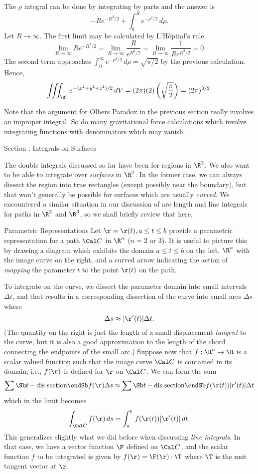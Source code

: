The $\rho$ integral can be done by integrating by parts and the
answer is
$$
 -Re^{-R^2/2} +
\int_0^R e^{-\rho^2/2}\,d\rho.
$$
Let $R \to \infty$.  The first limit may be calculated by L'H\^opital's
rule.
$$
\lim_{R\to\infty}
Re^{-R^2/2} = 
\lim_{R\to\infty}
\frac R{e^{R^2/2}} = 
\lim_{R\to\infty}
\frac 1{R e^{R^2/2}} =  0.
$$
 The second
term approaches $\int_0^\infty e^{-\rho^2/2}\,d\rho = \sqrt{\pi/2}$
by the previous calculation.   Hence,
$$
    \iiint_{\R^3} e^{-(x^2 + y^2 + z^2)/2}\,dV 
= (2\pi)(2)\left(\sqrt{\frac\pi 2}\right) = (2\pi)^{3/2}.
$$
\endexample

\medskip
Note that the argument for Olbers Paradox in the previous section
really involves an improper integral.   So do many gravitational
force calculations which involve integrating functions with
denominators which may vanish.

\bigskip

\bigskip
{}
\head Section \sn.  Integrals on Surfaces \endhead

The double
integrals discussed so far have been for regions in $\R^2$.
We also want to be able to integrate over {\it surfaces\/} in $\R^3$.
In the former case, we can always dissect the region into
true rectangles (except possibly near the boundary), but that
won't generally be possible for surfaces which are usually
{\it curved}.   We encountered a similar situation in our
discussion of arc length and line integrals for paths in
$\R^2$ and $\R^3$, so we shall briefly review that here.

\subhead Parametric Representations \endsubhead
Let $\r = \r(t), a\le t \le b$ provide a parametric representation
for a path $\Cal C$ in $\R^n$ ($n = 2$ or $3$). 
  It is useful to picture
this by drawing a diagram which exhibits the domain $a\le t \le b$
on the left, $\R^n$ with the image curve on the right, and a
curved arrow indicating the action of {\it mapping\/} the parameter
$t$ to the point $\r(t)$ on the path. 
\medskip
\centerline{}
\medskip
To integrate on the curve, we dissect the parameter domain
into small intervals  $\Delta t$, and that results in
a corresponding dissection of the curve into small arcs
$\Delta s$ where
$$
   \Delta s \approx |\r'(t)| \Delta t.
$$   
(The quantity on the right is just the length of a small displacement
{\it tangent\/} to the curve, but it is also a good approximation
to the length of the chord connecting the endpoints of the small
arc.)   Suppose now that $f:\R^n \to \R$ is a scalar valued function
such that the image curve $\Cal C$ is contained in its domain, i.e.,
$f(\r)$ is defined for $\r$ on $\Cal C$.  We can form the sum
$$
\sum\Sb t-\text{dis-}\\ \text{section}\endSb f(\r)\Delta s
   \approx
\sum\Sb t-\text{dis-}\\ \text{section}\endSb f(\r(t))|r'(t)|\Delta t
$$
which in the limit becomes
$$
\int_{\Cal C} f(\r)\,ds = \int_a^b \,f(\r(t))|\r'(t)|\,dt.
$$
 This generalizes slightly what we did before when discussing
{\it line integrals}.   In that case, we have a vector function
%
%
$\F$ defined on $\Cal C$, and the scalar function $f$ to be
integrated is given by $f(\r) = \F(\r)\cdot \T$ where $\T$ is
the unit tangent vector at $\r$.

